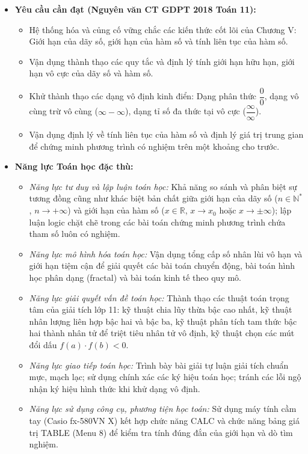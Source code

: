 \documentclass[12pt, a4paper]{article}
\begin{document}
\begin{itemize}[leftmargin=1.2cm]
    \item \textbf{Yêu cầu cần đạt (Nguyên văn CT GDPT 2018 Toán 11):}
    \begin{itemize}[leftmargin=0.6cm]
        \item Hệ thống hóa và củng cố vững chắc các kiến thức cốt lõi của Chương V: Giới hạn của dãy số, giới hạn của hàm số và tính liên tục của hàm số.
        \item Vận dụng thành thạo các quy tắc và định lý tính giới hạn hữu hạn, giới hạn vô cực của dãy số và hàm số.
        \item Khử thành thạo các dạng vô định kinh điển: Dạng phân thức $\dfrac{0}{0}$, dạng vô cùng trừ vô cùng ($\infty - \infty$), dạng tỉ số đa thức tại vô cực ($\dfrac{\infty}{\infty}$).
        \item Vận dụng định lý về tính liên tục của hàm số và định lý giá trị trung gian để chứng minh phương trình có nghiệm trên một khoảng cho trước.
    \end{itemize}

    \item \textbf{Năng lực Toán học đặc thù:}
    \begin{itemize}[leftmargin=0.6cm]
        \item \textit{Năng lực tư duy và lập luận toán học:} Khả năng so sánh và phân biệt sự tương đồng cũng như khác biệt bản chất giữa giới hạn của dãy số ($n \in \mathbb{N}^*$, $n \to +\infty$) và giới hạn của hàm số ($x \in \mathbb{R}$, $x \to x_0$ hoặc $x \to \pm\infty$); lập luận logic chặt chẽ trong các bài toán chứng minh phương trình chứa tham số luôn có nghiệm.
        \item \textit{Năng lực mô hình hóa toán học:} Vận dụng tổng cấp số nhân lùi vô hạn và giới hạn tiệm cận để giải quyết các bài toán chuyển động, bài toán hình học phân dạng (fractal) và bài toán kinh tế theo quy mô.
        \item \textit{Năng lực giải quyết vấn đề toán học:} Thành thạo các thuật toán trọng tâm của giải tích lớp 11: kỹ thuật chia lũy thừa bậc cao nhất, kỹ thuật nhân lượng liên hợp bậc hai và bậc ba, kỹ thuật phân tích tam thức bậc hai thành nhân tử để triệt tiêu nhân tử vô định, kỹ thuật chọn các mút đổi dấu $f(a) \cdot f(b) < 0$.
        \item \textit{Năng lực giao tiếp toán học:} Trình bày bài giải tự luận giải tích chuẩn mực, mạch lạc; sử dụng chính xác các ký hiệu toán học; tránh các lỗi ngộ nhận ký hiệu hình thức khi khử dạng vô định.
        \item \textit{Năng lực sử dụng công cụ, phương tiện học toán:} Sử dụng máy tính cầm tay (Casio fx-580VN X) kết hợp chức năng CALC và chức năng bảng giá trị TABLE (Menu 8) để kiểm tra tính đúng đắn của giới hạn và dò tìm nghiệm.
    \end{itemize}


\end{itemize}
\end{document}
